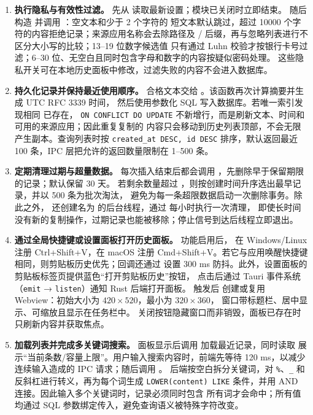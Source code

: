 \documentclass[12pt,a4paper]{ctexart}
\begin{document}
\begin{sloppypar}
\begin{enumerate}[label=(\arabic*)]
  \item \textbf{执行隐私与有效性过滤。}
     先从  读取最新设置；模块已关闭时立即结束。
    随后构造  并调用 ：空文本和少于 2 个字符的
    短文本默认跳过，超过 10000 个字符的内容拒绝记录；来源应用名称会去除路径及
    / 后缀，再与忽略列表进行不区分大小写的比较；13--19 位数字候选值
    只有通过 Luhn 校验才按银行卡号过滤；6--30 位、无空白且同时包含字母和数字的内容按疑似密码处理。
    这些隐私开关可在本地历史面板中修改，过滤失败的内容不会进入数据库。

  \item \textbf{持久化记录并保持最近使用顺序。}
    合格文本交给 。该函数再次计算摘要并生成 UTC RFC 3339 时间，
    然后使用参数化 SQL 写入数据库。若唯一索引发现相同  已存在，
    \texttt{ON CONFLICT DO UPDATE} 不新增行，而是刷新文本、时间和可用的来源应用；因此重复复制的
    内容只会移动到历史列表顶部，不会无限产生副本。查询列表时按 \texttt{created\_at DESC, id DESC}
    排序，默认返回最近 100 条，IPC 层把允许的返回数量限制在 1--500 条。

  \item \textbf{定期清理过期与超量数据。}
    每次插入结束后都会调用 ，先删除早于保留期限的记录；默认保留 30 天。
    若剩余数量超过 ，则按创建时间升序选出最早记录，并以 500 条为批次淘汰，
    避免为每一条超限数据启动一次删除事务。除此之外， 还创建名为
     的后台线程，通过  每小时执行一次清理，
    即使长时间没有新的复制操作，过期记录也能被移除；停止信号到达后线程立即退出。

  \item \textbf{通过全局快捷键或设置面板打开历史面板。}
    功能启用后， 在 Windows/Linux 注册 Ctrl+Shift+V，在 macOS 注册
    Cmd+Shift+V。若它与应用唤醒快捷键相同，则剪贴板历史优先；回调还通过
     设置 300 ms 防抖。此外，设置面板的剪贴板标签页提供蓝色“打开剪贴板历史”按钮，
    点击后通过 Tauri 事件系统（\texttt{emit} → \texttt{listen}）通知 Rust 后端打开面板。
    触发后  创建或复用
     Webview：初始大小为 $420\times520$，最小为 $320\times360$，
    窗口带标题栏、居中显示、可缩放且显示在任务栏中。
    关闭按钮隐藏窗口而非销毁，面板已存在时只刷新内容并获取焦点。

  \item \textbf{加载列表并完成多关键词搜索。}
    面板显示后调用  加载最近记录，同时读取
     展示“当前条数/容量上限”。用户输入搜索内容时，前端先等待
    120 ms，以减少连续输入造成的 IPC 请求；随后调用 。
    后端按空白拆分关键词，对 \texttt{\%}、\texttt{\_} 和反斜杠进行转义，再为每个词生成
    \texttt{LOWER(content) LIKE} 条件，并用 AND 连接。因此输入多个关键词时，记录必须同时包含
    所有词才会命中；所有值均通过 SQL 参数绑定传入，避免查询语义被特殊字符改变。


\end{enumerate}
\end{sloppypar}
\end{document}
